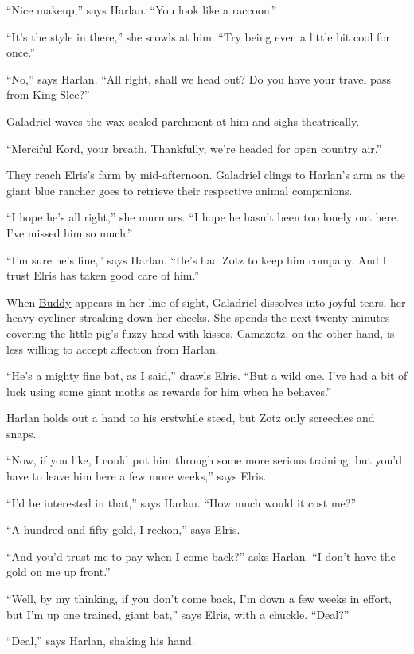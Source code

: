 \documentclass[smalldemyvopaper,11pt,twoside,onecolumn,openright,extrafontsizes]{memoir}
\begin{document}
``Nice makeup,'' says Harlan. ``You look like a raccoon.''

``It's the style in there,'' she scowls at him. ``Try being even a
little bit cool for once.''

``No,'' says Harlan. ``All right, shall we head out? Do you have your
travel pass from King Slee?''

Galadriel waves the wax-sealed parchment at him and sighs theatrically.

``Merciful Kord, your breath. Thankfully, we're headed for open country
air.''

They reach Elris's farm by mid-afternoon. Galadriel clings to Harlan's
arm as the giant blue rancher goes to retrieve their respective animal
companions.

``I hope he's all right,'' she murmurs. ``I hope he hasn't been too
lonely out here. I've missed him so much.''

``I'm sure he's fine,'' says Harlan. ``He's had Zotz to keep him
company. And I trust Elris has taken good care of him.''

When \href{/characters/buddy/}{Buddy} appears in her line of sight,
Galadriel dissolves into joyful tears, her heavy eyeliner streaking down
her cheeks. She spends the next twenty minutes covering the little pig's
fuzzy head with kisses. Camazotz, on the other hand, is less willing to
accept affection from Harlan.

``He's a mighty fine bat, as I said,'' drawls Elris. ``But a wild one.
I've had a bit of luck using some giant moths as rewards for him when he
behaves.''

Harlan holds out a hand to his erstwhile steed, but Zotz only screeches
and snaps.

``Now, if you like, I could put him through some more serious training,
but you'd have to leave him here a few more weeks,'' says Elris.

``I'd be interested in that,'' says Harlan. ``How much would it cost
me?''

``A hundred and fifty gold, I reckon,'' says Elris.

``And you'd trust me to pay when I come back?'' asks Harlan. ``I don't
have the gold on me up front.''

``Well, by my thinking, if you don't come back, I'm down a few weeks in
effort, but I'm up one trained, giant bat,'' says Elris, with a chuckle.
``Deal?''

``Deal,'' says Harlan, shaking his hand.
\end{document}
